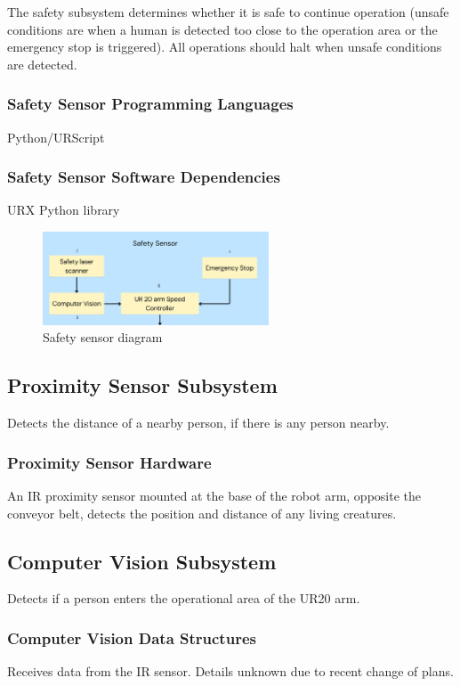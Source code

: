 
The safety subsystem determines whether it is safe to continue operation (unsafe conditions are when a human is detected too close to the operation area or the emergency stop is triggered). All operations should halt when unsafe conditions are detected.

\subsubsection{Safety Sensor Programming Languages}
Python/URScript

\subsubsection{Safety Sensor Software Dependencies}
URX Python library

\begin{figure}[h!]
	\centering
 	\includegraphics[width=0.60\textwidth]{images/safety.png}
 \caption{Safety sensor diagram}
\end{figure}

\subsection{Proximity Sensor Subsystem}
Detects the distance of a nearby person, if there is any person nearby.

\subsubsection{Proximity Sensor Hardware}
An IR proximity sensor mounted at the base of the robot arm, opposite the conveyor belt, detects the position and distance of any living creatures.


\subsection{Computer Vision Subsystem}
Detects if a person enters the operational area of the UR20 arm.

\subsubsection{Computer Vision Data Structures}
Receives data from the IR sensor. Details unknown due to recent change of plans.

